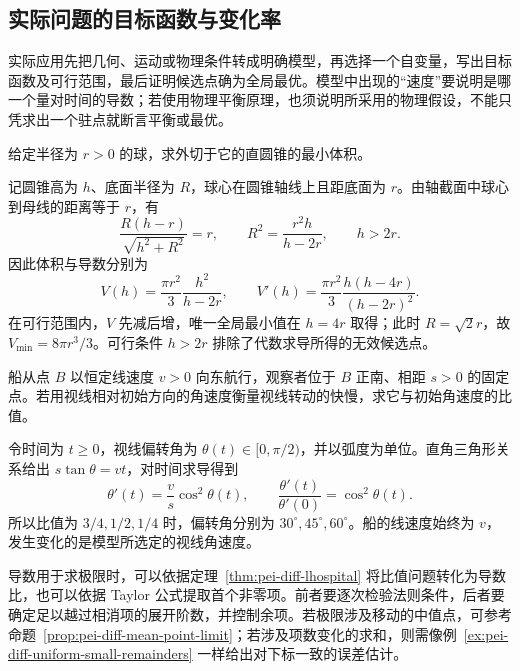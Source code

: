 \subsection{实际问题的目标函数与变化率}

实际应用先把几何、运动或物理条件转成明确模型，再选择一个自变量，写出目标函数及可行范围，最后证明候选点确为全局最优。模型中出现的“速度”要说明是哪一个量对时间的导数；若使用物理平衡原理，也须说明所采用的物理假设，不能只凭求出一个驻点就断言平衡或最优。

\begin{example}
\label{ex:pei-diff-circumscribed-cone}
给定半径为 $r>0$ 的球，求外切于它的直圆锥的最小体积。
\end{example}
\begin{solve}
记圆锥高为 $h$、底面半径为 $R$，球心在圆锥轴线上且距底面为 $r$。由轴截面中球心到母线的距离等于 $r$，有
\[
 \frac{R(h-r)}{\sqrt{h^2+R^2}}=r,
 \qquad R^2=\frac{r^2h}{h-2r},\qquad h>2r.
\]
因此体积与导数分别为
\[
 V(h)=\frac{\pi r^2}{3}\frac{h^2}{h-2r},\qquad
 V'(h)=\frac{\pi r^2}{3}\frac{h(h-4r)}{(h-2r)^2}.
\]
在可行范围内，$V$ 先减后增，唯一全局最小值在 $h=4r$ 取得；此时 $R=\sqrt2r$，故 $V_{\min}=8\pi r^3/3$。可行条件 $h>2r$ 排除了代数求导所得的无效候选点。
\end{solve}

\begin{example}
\label{ex:pei-diff-angular-speed}
船从点 $B$ 以恒定线速度 $v>0$ 向东航行，观察者位于 $B$ 正南、相距 $s>0$ 的固定点。若用视线相对初始方向的角速度衡量视线转动的快慢，求它与初始角速度的比值。
\end{example}
\begin{solve}
令时间为 $t\ge0$，视线偏转角为 $\theta(t)\in[0,\pi/2)$，并以弧度为单位。直角三角形关系给出 $s\tan\theta=vt$，对时间求导得到
\[
 \theta'(t)=\frac vs\cos^2\theta(t),\qquad
 \frac{\theta'(t)}{\theta'(0)}=\cos^2\theta(t).
\]
所以比值为 $3/4,1/2,1/4$ 时，偏转角分别为 $30^\circ,45^\circ,60^\circ$。船的线速度始终为 $v$，发生变化的是模型所选定的视线角速度。
\end{solve}

导数用于求极限时，可以依据定理~\ref{thm:pei-diff-lhospital} 将比值问题转化为导数比，也可以依据 Taylor 公式提取首个非零项。前者要逐次检验法则条件，后者要确定足以越过相消项的展开阶数，并控制余项。若极限涉及移动的中值点，可参考命题~\ref{prop:pei-diff-mean-point-limit}；若涉及项数变化的求和，则需像例~\ref{ex:pei-diff-uniform-small-remainders} 一样给出对下标一致的误差估计。





